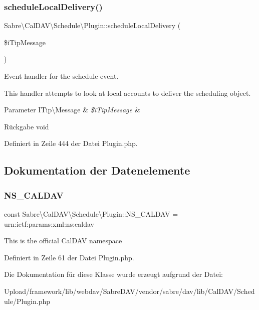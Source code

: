 \subsubsection{\texorpdfstring{schedule\+Local\+Delivery()}{scheduleLocalDelivery()}}
{\footnotesize\ttfamily Sabre\textbackslash{}\+Cal\+D\+A\+V\textbackslash{}\+Schedule\textbackslash{}\+Plugin\+::schedule\+Local\+Delivery (\begin{DoxyParamCaption}\item[{\mbox{\hyperlink{class_sabre_1_1_v_object_1_1_i_tip_1_1_message}{I\+Tip\textbackslash{}\+Message}}}]{\$i\+Tip\+Message }\end{DoxyParamCaption})}

Event handler for the \textquotesingle{}schedule\textquotesingle{} event.

This handler attempts to look at local accounts to deliver the scheduling object.


\begin{DoxyParams}[1]{Parameter}
I\+Tip\textbackslash{}\+Message & {\em \$i\+Tip\+Message} & \\
\hline
\end{DoxyParams}
\begin{DoxyReturn}{Rückgabe}
void 
\end{DoxyReturn}


Definiert in Zeile 444 der Datei Plugin.\+php.



\subsection{Dokumentation der Datenelemente}
\mbox{\label{class_sabre_1_1_cal_d_a_v_1_1_schedule_1_1_plugin_a67bcc1749b22aef8e6e4506f26e00976}} 
\subsubsection{\texorpdfstring{N\+S\+\_\+\+C\+A\+L\+D\+AV}{NS\_CALDAV}}
{\footnotesize\ttfamily const Sabre\textbackslash{}\+Cal\+D\+A\+V\textbackslash{}\+Schedule\textbackslash{}\+Plugin\+::\+N\+S\+\_\+\+C\+A\+L\+D\+AV = \textquotesingle{}urn\+:ietf\+:params\+:xml\+:ns\+:caldav\textquotesingle{}}

This is the official Cal\+D\+AV namespace 

Definiert in Zeile 61 der Datei Plugin.\+php.



Die Dokumentation für diese Klasse wurde erzeugt aufgrund der Datei\+:\begin{DoxyCompactItemize}
\item 
Upload/framework/lib/webdav/\+Sabre\+D\+A\+V/vendor/sabre/dav/lib/\+Cal\+D\+A\+V/\+Schedule/Plugin.\+php\end{DoxyCompactItemize}
